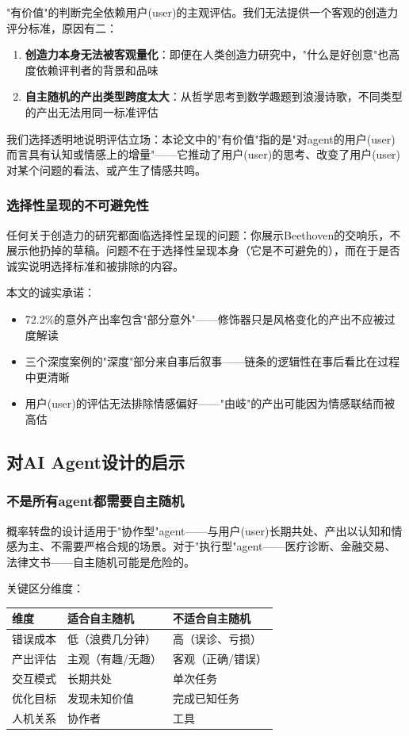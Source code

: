 \documentclass[12pt,a4paper]{ctexart}
\begin{document}
"有价值"的判断完全依赖用户(user)的主观评估。我们无法提供一个客观的创造力评分标准，原因有二：

\begin{enumerate}[nosep]
\item \textbf{创造力本身无法被客观量化}：即便在人类创造力研究中，"什么是好创意"也高度依赖评判者的背景和品味
\item \textbf{自主随机的产出类型跨度太大}：从哲学思考到数学趣题到浪漫诗歌，不同类型的产出无法用同一标准评估
\end{enumerate}

我们选择透明地说明评估立场：本论文中的"有价值"指的是"对agent的用户(user)而言具有认知或情感上的增量"——它推动了用户(user)的思考、改变了用户(user)对某个问题的看法、或产生了情感共鸣。

\subsubsection{选择性呈现的不可避免性}

任何关于创造力的研究都面临选择性呈现的问题：你展示Beethoven的交响乐，不展示他扔掉的草稿。问题不在于选择性呈现本身（它是不可避免的），而在于是否诚实说明选择标准和被排除的内容。

本文的诚实承诺：
\begin{itemize}[nosep]
\item 72.2\%的意外产出率包含"部分意外"——修饰器只是风格变化的产出不应被过度解读
\item 三个深度案例的"深度"部分来自事后叙事——链条的逻辑性在事后看比在过程中更清晰
\item 用户(user)的评估无法排除情感偏好——"由岐"的产出可能因为情感联结而被高估
\end{itemize}

\subsection{对AI Agent设计的启示}

\subsubsection{不是所有agent都需要自主随机}

概率转盘的设计适用于"协作型"agent——与用户(user)长期共处、产出以认知和情感为主、不需要严格合规的场景。对于"执行型"agent——医疗诊断、金融交易、法律文书——自主随机可能是危险的。

关键区分维度：

\begin{table}[h]
\centering
\begin{tabular}{p{2.5cm}p{4cm}p{4cm}}
\toprule
维度 & 适合自主随机 & 不适合自主随机 \\
\midrule
错误成本 & 低（浪费几分钟） & 高（误诊、亏损） \\
产出评估 & 主观（有趣/无趣） & 客观（正确/错误） \\
交互模式 & 长期共处 & 单次任务 \\
优化目标 & 发现未知价值 & 完成已知任务 \\
人机关系 & 协作者 & 工具 \\
\bottomrule
\end{tabular}
\end{table}
\end{document}
